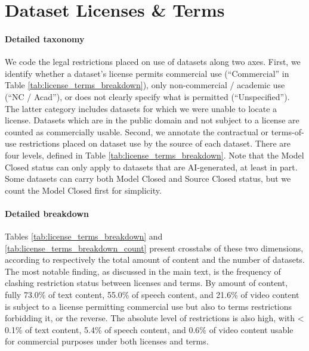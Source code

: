 \section{Dataset Licenses \& Terms}
\label{app:licenses-and-terms}

\paragraph{Detailed taxonomy}
We code the legal restrictions placed on use of datasets along two axes. First, we identify whether a dataset's license permits commercial use (``Commercial'' in Table \ref{tab:license_terms_breakdown}), only non-commercial / academic use (``NC / Acad''), or does not clearly specify what is permitted (``Unspecified''). 
The latter category includes datasets for which we were unable to locate a license.
Datasets which are in the public domain and not subject to a license are counted as commercially usable.
Second, we annotate the contractual or terms-of-use restrictions placed on dataset use by the source of each dataset. There are four levels, defined in Table \ref{tab:license_terms_breakdown}. Note that the Model Closed status can only apply to datasets that are AI-generated, at least in part.
Some datasets can carry both Model Closed and Source Closed status, but we count the Model Closed first for simplicity.



\paragraph{Detailed breakdown}
Tables \ref{tab:license_terms_breakdown} and \ref{tab:license_terms_breakdown_count} present crosstabs of these two dimensions, according to respectively the total amount of content and the number of datasets. The most notable finding, as discussed in the main text, is the frequency of clashing restriction status between licenses and terms. By amount of content, fully 73.0\% of text content, 55.0\% of speech content, and 21.6\% of video content is subject to a license permitting commercial use but also to terms restrictions forbidding it, or the reverse. The absolute level of restrictions is also high, with < 0.1\% of text content, 5.4\% of speech content, and 0.6\% of video content usable for commercial purposes under both licenses and terms.



